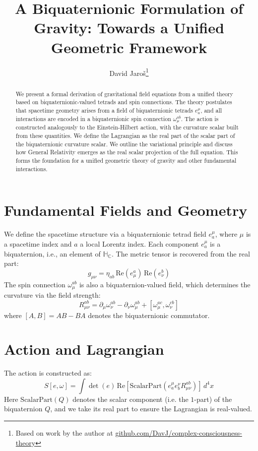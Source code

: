 \documentclass[11pt]{article}
\title{\textbf{A Biquaternionic Formulation of Gravity: Towards a Unified Geometric Framework}}
\author{David Jaroš\thanks{Based on work by the author at \href{https://github.com/DavJ/complex-consciousness-theory}{github.com/DavJ/complex-consciousness-theory}}}
\affil{Independent Researcher}
\date{}
\begin{document}
\maketitle

\begin{abstract}
We present a formal derivation of gravitational field equations from a unified theory based on biquaternionic-valued tetrads and spin connections. The theory postulates that spacetime geometry arises from a field of biquaternionic tetrads \( e^\mu_a \), and all interactions are encoded in a biquaternionic spin connection \( \omega_\mu^{ab} \). The action is constructed analogously to the Einstein-Hilbert action, with the curvature scalar built from these quantities. We define the Lagrangian as the real part of the scalar part of the biquaternionic curvature scalar. We outline the variational principle and discuss how General Relativity emerges as the real scalar projection of the full equation. This forms the foundation for a unified geometric theory of gravity and other fundamental interactions.
\end{abstract}

\section{Fundamental Fields and Geometry}
We define the spacetime structure via a biquaternionic tetrad field \( e^\mu_a \), where \( \mu \) is a spacetime index and \( a \) a local Lorentz index. Each component \( e^\mu_a \) is a biquaternion, i.e., an element of \( \mathbb{H}_\mathbb{C} \). The metric tensor is recovered from the real part:
\[
g_{\mu\nu} = \eta_{ab} \, \text{Re}(e^a_\mu) \, \text{Re}(e^b_\nu)
\]
The spin connection \( \omega_\mu^{ab} \) is also a biquaternion-valued field, which determines the curvature via the field strength:
\[
R_{\mu\nu}^{ab} = \partial_\mu \omega_\nu^{ab} - \partial_\nu \omega_\mu^{ab} + [\omega_\mu^{ac}, \omega_\nu^{cb}]
\]
where \( [A,B] = AB - BA \) denotes the biquaternionic commutator.

\section{Action and Lagrangian}
The action is constructed as:
\[
S[e,\omega] = \int \det(e) \, \text{Re} \left[ \text{ScalarPart} \left( e^\mu_a e^\nu_b R_{\mu\nu}^{ab} \right) \right] \, d^4x
\]
Here \( \text{ScalarPart}(Q) \) denotes the scalar component (i.e. the \( 1 \)-part) of the biquaternion \( Q \), and we take its real part to ensure the Lagrangian is real-valued.
\end{document}
